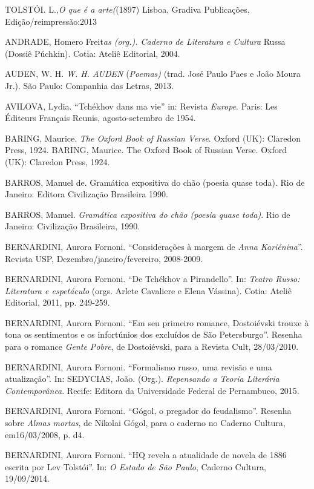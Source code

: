 {{{TOLSTÓI. L.,\emph{O que é a arte(}(1897) Lisboa, Gradiva Publicações,
Edição/reimpressão:2013


ANDRADE, Homero Freit\emph{as (org.). Caderno de Literatura e Cultura}
Russa (Dossiê Púchkin). Cotia: Ateliê Editorial, 2004.

AUDEN, W. H. \emph{W. H. AUDEN} (\emph{Poemas)} (trad. José Paulo Paes e
João Moura Jr.). São Paulo: Companhia das Letras, 2013.

AVILOVA, Lydia. ``Tchékhov dans ma vie'' in: Revista \emph{Europe}.
Paris: Les Éditeurs Français Reunis, agosto-setembro de 1954.

BARING, Maurice. \emph{The Oxford Book of
Russian Verse}. Oxford (UK): Claredon Press,
1924. BARING, Maurice. The Oxford Book of Russian Verse. Oxford (UK): Claredon Press, 1924.\label{baring-maurice.-the-oxford-book-of-russian-verse.-oxford-uk-claredon-press-1924.}

BARROS, Manuel de. Gramática expositiva do chão (poesia quase toda). Rio
de Janeiro: Editora Civilização Brasileira 1990.

BARROS, Manuel. \emph{Gramática expositiva do chão (poesia quase toda)}.
Rio de Janeiro: Civilização Brasileira, 1990.

BERNARDINI, Aurora Fornoni. ``Considerações à margem de \emph{Anna
Kariénina}''. Revista USP, Dezembro/janeiro/fevereiro, 2008-2009.

BERNARDINI, Aurora Fornoni. ``De Tchékhov a Pirandello''. In:
\emph{Teatro Russo: Literatura e espetáculo} (orgs. Arlete Cavaliere e
Elena Vássina). Cotia: Ateliê Editorial, 2011, pp. 249-259.

BERNARDINI, Aurora Fornoni. ``Em seu primeiro romance, Dostoiévski
trouxe à tona os sentimentos e os infortúnios dos excluídos de São
Petersburgo''. Resenha para o romance \emph{Gente Pobre}, de
Dostoiévski, para a Revista Cult, 28/03/2010.

BERNARDINI, Aurora Fornoni. ``Formalismo russo, uma revisão e uma
atualização''. In: SEDYCIAS, João. (Org.). \emph{Repensando a Teoria
Literária Contemporânea}. Recife: Editora da Universidade Federal de
Pernambuco, 2015.

BERNARDINI, Aurora Fornoni. ``Gógol, o pregador do feudalismo''. Resenha
sobre \emph{Almas mortas}, de Nikolai Gógol, para o caderno no Caderno
Cultura, em16/03/2008, p. d4.

BERNARDINI, Aurora Fornoni. ``HQ revela a atualidade de novela de 1886
escrita por Lev Tolstói''. In: \emph{O Estado de São Paulo}, Caderno
Cultura, 19/09/2014.

}}}
